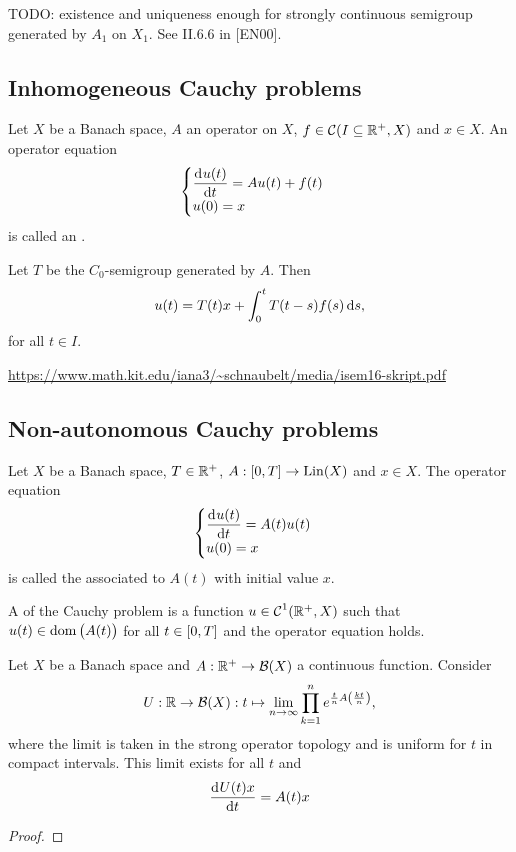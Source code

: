 TODO: existence and uniqueness enough for strongly continuous semigroup generated by $A_1$ on $X_1$. See II.6.6 in [EN00].

\subsection{Inhomogeneous Cauchy problems}
\begin{definition}
Let $X$ be a Banach space, $A$ an operator on $X$, $f\in \operatorname{\mathcal{C}}(I\subseteq \mathbb{R}^+, X)$ and $x\in X$. An operator equation
\[ \begin{cases}
\mathinner{ \dfrac{\operatorname{d \!}{^{}}u(t)}{\operatorname{d \!}{{t}^{}}} } = Au(t) + f(t) \\ u(0) = x
\end{cases} \]
is called an .
\end{definition}

\begin{theorem}
Let $T$ be the $C_0$-semigroup generated by $A$. Then
\[ u(t) = T(t)x + \int_0^t T(t-s)f(s)\operatorname{d \!}{s}, \]
for all $t\in I$.
\end{theorem}

\url{https://www.math.kit.edu/iana3/~schnaubelt/media/isem16-skript.pdf}

\subsection{Non-autonomous Cauchy problems}
\begin{definition}
Let $X$ be a Banach space, $T\in \mathbb{R}^+$, $A: \interval{0,T} \to \Lin(X)$ and $x\in X$. The operator equation
\[ \begin{cases}
\mathinner{ \dfrac{\operatorname{d \!}{^{}}u(t)}{\operatorname{d \!}{{t}^{}}} } = A(t)u(t) \\ u(0) = x
\end{cases} \]
is called the  associated to $A(t)$ with initial value $x$.

A  of the Cauchy problem is a function $u\in \operatorname{\mathcal{C}}^1(\mathbb{R}^+, X)$ such that $u(t) \in \operatorname{dom}\big(A(t)\big)$ for all $t\in \interval{0,T}$ and the operator equation holds.
\end{definition}

\begin{proposition}
Let $X$ be a Banach space and $A: \mathbb{R}^+\to \operatorname{\mathcal{B}}(X)$ a continuous function. Consider
\[ U: \mathbb{R}\to \operatorname{\mathcal{B}}(X): t\mapsto \lim_{n\to\infty}\prod_{k=1}^ne^{\frac{t}{n}A\left(\frac{kt}{n}\right)}, \]
where the limit is taken in the strong operator topology and is uniform for $t$ in compact intervals. This limit exists for all $t$ and
\[ \mathinner{ \dfrac{\operatorname{d \!}{^{}}U(t)x}{\operatorname{d \!}{{t}^{}}} } = A(t)x \]
\end{proposition}
\begin{proof}

\end{proof}


